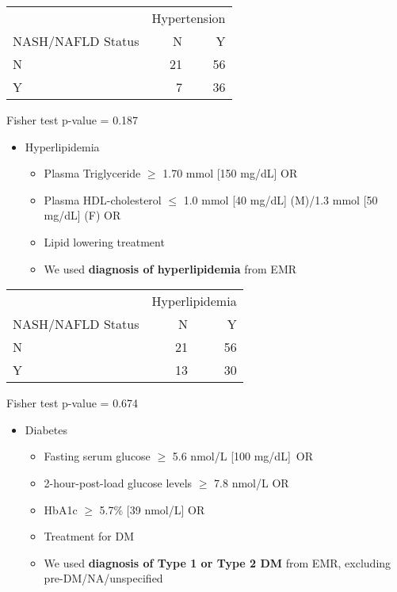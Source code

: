 \documentclass[
]{article}
\providecommand{\tightlist}{%
  \setlength{\itemsep}{0pt}\setlength{\parskip}{0pt}}
\begin{document}
\begingroup
\fontsize{12.0pt}{14.4pt}\selectfont
\setlength{\LTpost}{0mm}
\begin{longtable}{l|rr}
\toprule
 & \multicolumn{2}{c}{Hypertension} \\ 
\cmidrule(lr){2-3}
NASH/NAFLD Status & N & Y \\ 
\midrule\addlinespace[2.5pt]
N & 21 & 56 \\ 
Y & 7 & 36 \\ 
\bottomrule
\end{longtable}
\begin{minipage}{\linewidth}
Fisher test p-value =  0.187\\
\end{minipage}
\endgroup

\begin{itemize}
\tightlist
\item
  Hyperlipidemia

  \begin{itemize}
  \tightlist
  \item
    Plasma Triglyceride \(\ge\) 1.70 mmol {[}150 mg/dL{]} OR
  \item
    Plasma HDL-cholesterol \(\le\) 1.0 mmol {[}40 mg/dL{]} (M)/1.3 mmol
    {[}50 mg/dL{]} (F) OR
  \item
    Lipid lowering treatment
  \item
    We used \textbf{diagnosis of hyperlipidemia} from EMR
  \end{itemize}
\end{itemize}

\begingroup
\fontsize{12.0pt}{14.4pt}\selectfont
\setlength{\LTpost}{0mm}
\begin{longtable}{l|rr}
\toprule
 & \multicolumn{2}{c}{Hyperlipidemia} \\ 
\cmidrule(lr){2-3}
NASH/NAFLD Status & N & Y \\ 
\midrule\addlinespace[2.5pt]
N & 21 & 56 \\ 
Y & 13 & 30 \\ 
\bottomrule
\end{longtable}
\begin{minipage}{\linewidth}
Fisher test p-value =  0.674\\
\end{minipage}
\endgroup

\begin{itemize}
\tightlist
\item
  Diabetes

  \begin{itemize}
  \tightlist
  \item
    Fasting serum glucose \(\ge\) 5.6 nmol/L {[}100 mg/dL{]}~OR
  \item
    2-hour-post-load glucose levels \(\ge\) 7.8 nmol/L OR
  \item
    HbA1c \(\ge\) 5.7\% {[}39 nmol/L{]} OR
  \item
    Treatment for DM
  \item
    We used \textbf{diagnosis of Type 1 or Type 2 DM} from EMR,
    excluding pre-DM/NA/unspecified
  \end{itemize}
\end{itemize}
\end{document}
